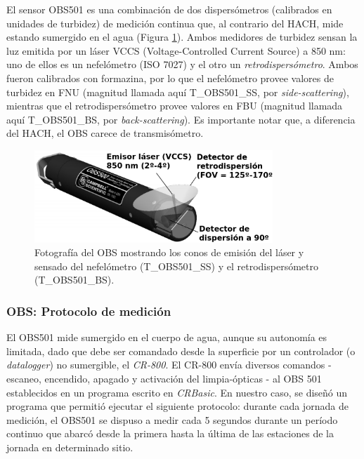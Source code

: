         El sensor OBS501 es una combinación de dos dispersómetros (calibrados en unidades de turbidez) de medición continua que, al contrario del HACH, mide estando sumergido en el agua (Figura \ref{dat:OBS}). Ambos medidores de turbidez sensan la luz emitida por un láser VCCS (Voltage-Controlled Current Source) a 850 nm: uno de ellos es un nefelómetro (ISO 7027) y el otro un \textit{retrodispersómetro}. Ambos fueron calibrados con formazina, por lo que el nefelómetro provee valores de turbidez en FNU (magnitud llamada aquí T\_OBS501\_SS, por \textit{side-scattering}), mientras que el retrodispersómetro provee valores en FBU (magnitud llamada aquí T\_OBS501\_BS, por \textit{back-scattering}). Es importante notar que, a diferencia del HACH, el OBS carece de transmisómetro.
        
        \begin{figure}
        \centering
        \includegraphics[width=0.8\textwidth]{dat/figures/OBS.png}
        \caption[Fotografía del OBS mostrando los conos de emisión del láser y sensado del nefelómetro y el retrodispersómetro.]{Fotografía del OBS mostrando los conos de emisión del láser y sensado del nefelómetro (T\_OBS501\_SS) y el retrodispersómetro (T\_OBS501\_BS).}
        \label{dat:OBS}
        \end{figure}

        \subsubsection{OBS: Protocolo de medición}
        \label{dat:s:obsMed}

            El OBS501 mide sumergido en el cuerpo de agua, aunque su autonomía es limitada, dado que debe ser comandado desde la superficie por un controlador (o \textit{datalogger}) no sumergible, el \textit{CR-800}. El CR-800 envía diversos comandos  - escaneo, encendido, apagado y activación del limpia-ópticas - al OBS 501 establecidos en un programa escrito en \textit{CRBasic}. En nuestro caso, se diseñó un programa que permitió ejecutar el siguiente protocolo: durante cada jornada de medición, el OBS501 se dispuso a medir cada 5 segundos durante un período continuo que abarcó desde la primera hasta la última de las estaciones de la jornada en determinado sitio.%
            
